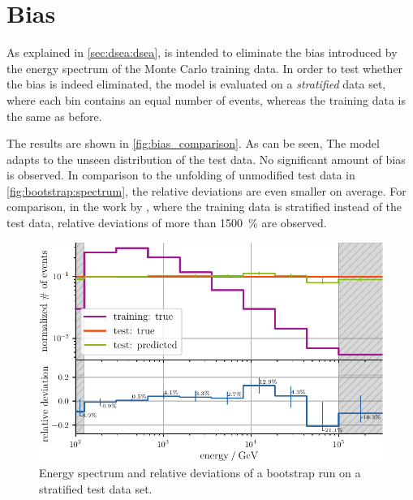 \clearpage %
\section{Bias} \label{sec:unfolding:bias}
As explained in \autoref{sec:dsea:dsea},
\dsea{} is intended to eliminate the bias introduced by the energy spectrum of the Monte Carlo training data.
%
In order to test
whether the bias is indeed eliminated,
the model is evaluated on a \emph{stratified} data set,
    where each bin contains an equal number of events,
whereas the training data is the same as before.
%

The results are shown in \autoref{fig:bias_comparison}.
As can be seen,
The model adapts to the unseen distribution of the test data.
No significant amount of bias is observed.
In comparison to the unfolding of unmodified test data in \autoref{fig:bootstrap:spectrum},
the relative deviations are even smaller on average.
%
For comparison,
in the work by \citeauthor{dsea_samuel} \cite{dsea_samuel},
  where the training data is stratified
    instead of the test data,
relative deviations of more than \SI{1500}{\percent} are observed.


\begin{figure}
  \centering
  \includegraphics[scale=1]{content/plots/bias:spectrum_full.pdf}
  \caption{
    Energy spectrum and relative deviations of a bootstrap run
    on a stratified test data set.
  }
  \label{fig:bias_comparison}
\end{figure}
